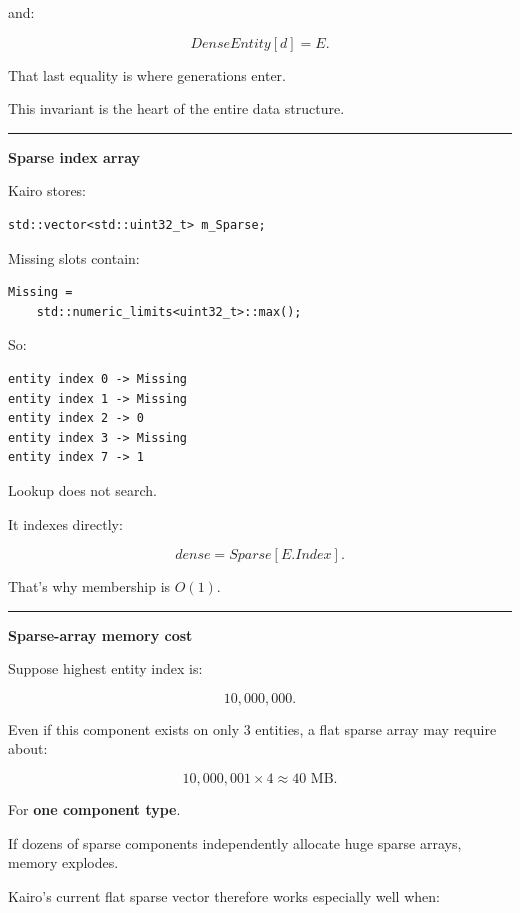 and:

\[
DenseEntity[d]=E.
\]

That last equality is where generations enter.

This invariant is the heart of the entire data structure.

\begin{center}\rule{0.5\linewidth}{0.5pt}\end{center}

\textbf{Sparse index array}

Kairo stores:

\begin{verbatim}
std::vector<std::uint32_t> m_Sparse;
\end{verbatim}

Missing slots contain:

\begin{verbatim}
Missing =
    std::numeric_limits<uint32_t>::max();
\end{verbatim}

So:

\begin{verbatim}
entity index 0 -> Missing
entity index 1 -> Missing
entity index 2 -> 0
entity index 3 -> Missing
entity index 7 -> 1
\end{verbatim}

Lookup does not search.

It indexes directly:

\[
dense=Sparse[E.Index].
\]

That's why membership is \(O(1)\).

\begin{center}\rule{0.5\linewidth}{0.5pt}\end{center}

\textbf{Sparse-array memory cost}

Suppose highest entity index is:

\[
10,000,000.
\]

Even if this component exists on only 3 entities, a flat  sparse array may require about:

\[
10,000,001\times4
\approx40\text{ MB}.
\]

For \textbf{one component type}.

If dozens of sparse components independently allocate huge sparse arrays, memory explodes.

Kairo's current flat sparse vector therefore works especially well when:

